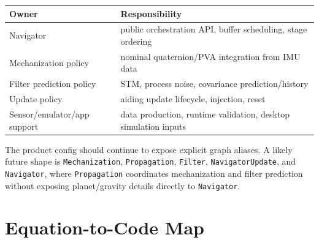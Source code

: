 \begin{center}
\begin{tabular}{p{}p{}}
\toprule
Owner & Responsibility \\
\midrule
Navigator & public orchestration API, buffer scheduling, stage ordering \\
Mechanization policy & nominal quaternion/PVA integration from IMU data \\
Filter prediction policy & STM, process noise, covariance prediction/history \\
Update policy & aiding update lifecycle, injection, reset \\
Sensor/emulator/app support & data production, runtime validation, desktop simulation inputs \\
\bottomrule
\end{tabular}
\end{center}

\begin{implbox}
The product config should continue to expose explicit graph aliases. A likely
future shape is \texttt{Mechanization}, \texttt{Propagation}, \texttt{Filter},
\texttt{NavigatorUpdate}, and \texttt{Navigator}, where \texttt{Propagation}
coordinates mechanization and filter prediction without exposing planet/gravity
details directly to \texttt{Navigator}.
\end{implbox}

\section{Equation-to-Code Map}

